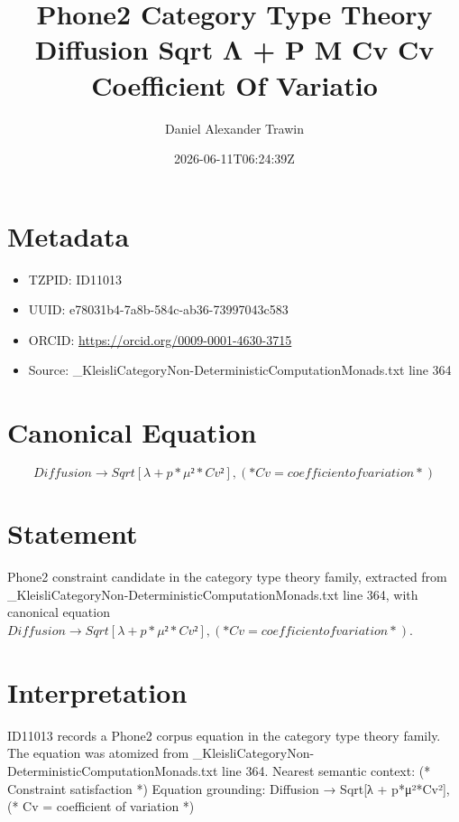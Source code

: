 \documentclass[11pt]{article}
\title{Phone2 Category Type Theory Diffusion Sqrt Λ + P Μ Cv Cv Coefficient Of Variatio}
\author{Daniel Alexander Trawin}
\date{2026-06-11T06:24:39Z}
\begin{document}
\maketitle
\section*{Metadata}
\begin{itemize}
\item TZPID: ID11013
\item UUID: e78031b4-7a8b-584c-ab36-73997043c583
\item ORCID: \url{https://orcid.org/0009-0001-4630-3715}
\item Source: _KleisliCategoryNon-DeterministicComputationMonads.txt line 364
\end{itemize}
\section*{Canonical Equation}
\[
Diffusion → Sqrt[λ + p*μ²*Cv²], (* Cv = coefficient of variation *)
\]
\section*{Statement}
Phone2 constraint candidate in the category type theory family, extracted from _KleisliCategoryNon-DeterministicComputationMonads.txt line 364, with canonical equation $Diffusion → Sqrt[λ + p*μ²*Cv²], (* Cv = coefficient of variation *)$.
\section*{Interpretation}
ID11013 records a Phone2 corpus equation in the category type theory family. The equation was atomized from _KleisliCategoryNon-DeterministicComputationMonads.txt line 364. Nearest semantic context: (* Constraint satisfaction *) Equation grounding: Diffusion → Sqrt[λ + p*μ²*Cv²], (* Cv = coefficient of variation *)
\end{document}
